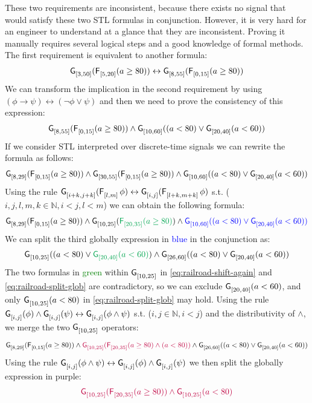\documentclass[acmsmall,screen]{acmart}
\begin{document}
These two requirements are inconsistent, because there exists no signal that would satisfy these two STL formulas in conjunction. However, it is very hard for an engineer to understand at a glance that they are inconsistent.
Proving it manually requires several logical steps and a good knowledge of formal methods.
The first requirement is equivalent to another formula:
\begin{equation}
\label{eq:railroad-shift-interval}
\mathop{\mathsf{\mathsf{G}}^{{}}_{[3,50]}}(\mathop{\mathsf{\mathsf{F}}^{{}}_{[5,20]}}(a \geq 80)) \leftrightarrow \mathop{\mathsf{\mathsf{G}}^{{}}_{[8,55]}}(\mathop{\mathsf{\mathsf{F}}^{{}}_{[0,15]}}(a \geq 80))
\end{equation}
We can transform the implication in the second requirement by using $(\phi \rightarrow \psi) \leftrightarrow (\neg \phi \vee \psi)$ and then we need to prove the consistency of this expression:
\[
\mathop{\mathsf{\mathsf{G}}^{{}}_{[8,55]}}(\mathop{\mathsf{\mathsf{F}}^{{}}_{[0,15]}}(a \geq 80))  \wedge \mathop{\mathsf{\mathsf{G}}^{{}}_{[10,60]}}( (a < 80) \vee \mathop{\mathsf{\mathsf{G}}^{{}}_{[20,40]}}(a < 60))
\]
If we consider STL interpreted over discrete-time signals we can rewrite the formula as follows:
\[
\mathop{\mathsf{\mathsf{G}}^{{}}_{[8,29]}}(\mathop{\mathsf{\mathsf{F}}^{{}}_{[0,15]}}(a \geq 80)) \wedge \mathop{\mathsf{\mathsf{G}}^{{}}_{[30,55]}}(\mathop{\mathsf{\mathsf{F}}^{{}}_{[0,15]}}(a \geq 80)) \wedge \mathop{\mathsf{\mathsf{G}}^{{}}_{[10,60]}}( (a < 80) \vee \mathop{\mathsf{\mathsf{G}}^{{}}_{[20,40]}}(a < 60))
\]
Using the rule  $\mathop{\mathsf{\mathsf{G}}^{{}}_{[i+k,j+k]}}(\mathop{\mathsf{\mathsf{F}}^{{}}_{[l,m]}} \phi) \leftrightarrow \mathop{\mathsf{\mathsf{G}}^{{}}_{[i,j]}} (\mathop{\mathsf{\mathsf{F}}^{{}}_{[l+k,m+k]}} \phi)$ s.t. ($i,j,l,m,k \in \mathbb{N}, i < j, l < m$) we can obtain the following formula:
\begin{equation}
\glob{[8,29]}(\even{[0,15]}(a \geq 80)) \wedge \glob{[10,25]}(\textcolor{Green}{\even{[20,35]}(a \geq 80)}) \wedge \textcolor{blue}{\glob{[10,60]}( (a < 80) \vee \glob{[20,40]}(a < 60))}
\label{eq:railroad-shift-again}
\end{equation}
We can split the third globally expression in \textcolor{blue}{blue} in the conjunction as:
\begin{equation}
\glob{[10,25]}( (a < 80) \vee \textcolor{Green}{\glob{[20,40]}(a < 60)}) \wedge \glob{[26,60]}( (a < 80) \vee \glob{[20,40]}(a < 60))
\label{eq:railroad-split-glob}
\end{equation}
The two formulas in \textcolor{Green}{green} within $\mathop{\mathsf{\mathsf{G}}^{{}}_{[10,25]}}$ in \eqref{eq:railroad-shift-again} and \eqref{eq:railroad-split-glob} are contradictory, so we can exclude $\mathop{\mathsf{\mathsf{G}}^{{}}_{[20,40]}}(a < 60)$, and only $\mathop{\mathsf{\mathsf{G}}^{{}}_{[10,25]}}(a < 80)$ in \eqref{eq:railroad-split-glob} may hold.
Using the rule $\mathop{\mathsf{\mathsf{G}}^{{}}_{[i,j]}}(\phi) \wedge \mathop{\mathsf{\mathsf{G}}^{{}}_{[i,j]}}(\psi) \leftrightarrow \mathop{\mathsf{\mathsf{G}}^{{}}_{[i,j]}}(\phi \wedge \psi)$ s.t. ($i,j \in \mathbb{N}, i < j$) and the distributivity of $\wedge$, we merge the two $\mathop{\mathsf{\mathsf{G}}^{{}}_{[10,25]}}$ operators:
\[
\mathop{\mathsf{\mathsf{G}}^{{}}_{[8,29]}}(\mathop{\mathsf{\mathsf{F}}^{{}}_{[0,15]}}(a \geq 80)) \wedge \textcolor{purple}{\mathop{\mathsf{\mathsf{G}}^{{}}_{[10,25]}}(\mathop{\mathsf{\mathsf{F}}^{{}}_{[20,35]}}(a \geq 80) \wedge (a < 80) )} \wedge \mathop{\mathsf{\mathsf{G}}^{{}}_{[26,60]}}( (a < 80) \vee \mathop{\mathsf{\mathsf{G}}^{{}}_{[20,40]}}(a < 60))
\]
Using the rule $\mathop{\mathsf{\mathsf{G}}^{{}}_{[i,j]}}(\phi \wedge \psi) \leftrightarrow \mathop{\mathsf{\mathsf{G}}^{{}}_{[i,j]}}(\phi) \wedge \mathop{\mathsf{\mathsf{G}}^{{}}_{[i,j]}}(\psi) $ we then split the globally expression in purple:
\[\textcolor{purple}{\mathop{\mathsf{\mathsf{G}}^{{}}_{[10,25]}}(\mathop{\mathsf{\mathsf{F}}^{{}}_{[20,35]}}(a \geq 80)) \wedge \mathop{\mathsf{\mathsf{G}}^{{}}_{[10,25]}}(a < 80)}\]
\end{document}
